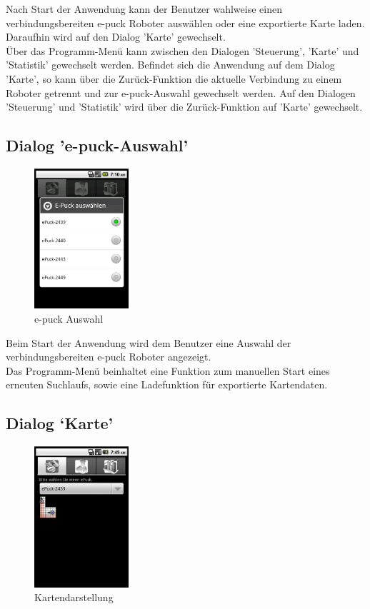 \documentclass[10pt,a4paper]{article}
\begin{document}
  			Nach Start der Anwendung kann der Benutzer wahlweise einen verbindungsbereiten e-puck Roboter auswählen oder eine
  			exportierte Karte laden. Daraufhin wird auf den Dialog 'Karte' gewechselt. \\
  			Über das Programm-Menü kann zwischen den Dialogen 'Steuerung', 'Karte' und 'Statistik' gewechselt werden. Befindet sich die
  			Anwendung auf dem Dialog 'Karte', so kann über die Zurück-Funktion die aktuelle Verbindung zu einem Roboter getrennt
  			und zur  e-puck-Auswahl gewechselt werden. Auf den Dialogen 'Steuerung' und 'Statistik' wird über die Zurück-Funktion
  			auf 'Karte' gewechselt.
  			
  			\subsection{Dialog 'e-puck-Auswahl'}
  			
			\begin{figure}[h]
				  \centering
				\includegraphics[width=3.5cm]{screenshots/android1a.png}
  				\caption{e-puck Auswahl}
  			\end{figure}	  				
  			
  				Beim Start der Anwendung wird dem Benutzer eine Auswahl der verbindungsbereiten e-puck Roboter angezeigt.  \\
  				Das Programm-Menü beinhaltet eine Funktion zum manuellen Start eines erneuten Suchlaufs, sowie eine Ladefunktion
  				für exportierte Kartendaten.
			
			\subsection{Dialog `Karte'}

			\begin{figure}[h]
				  \centering
				\includegraphics[width=3.5cm]{screenshots/android1b.png}
  				\caption{Kartendarstellung}
  			\end{figure}						
			
\end{document}
